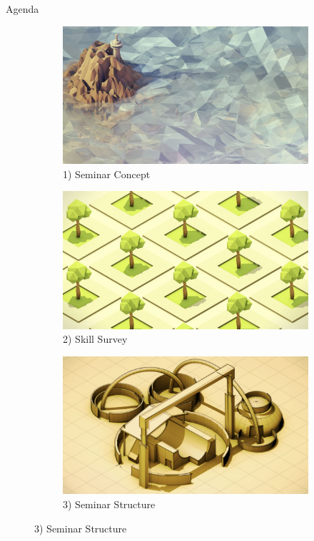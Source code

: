 \begin{frame}{Agenda}
\begin{figure}
		\centering
		\begin{subfigure}[b]{0.3\textwidth}
			\centering
			\includegraphics[width=\textwidth]{intro/concept}
			\caption{\normalsize 1) Seminar Concept}
		\end{subfigure}%
		\quad
		\begin{subfigure}[b]{0.3\textwidth}
			\centering
			\includegraphics[width=\textwidth]{intro/survey}
			\caption{\normalsize 2) Skill Survey}
		\end{subfigure}
		\quad
		\begin{subfigure}[b]{0.3\textwidth}
			\centering
			\includegraphics[width=\textwidth]{intro/structure}
			\caption{\normalsize 3) Seminar Structure}
		\end{subfigure}


\end{figure}
\end{frame}

